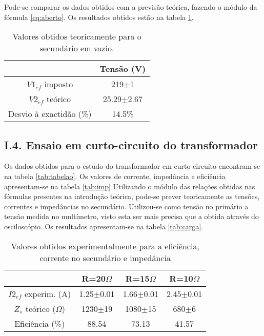 \documentclass[%
  reprint,
  nofootinbib,
  amsmath,amssymb,
  aps,
  10pt,
]{revtex4-1}
\begin{document}
Pode-se comparar os dados obtidos com a previsão teórica, fazendo o módulo da fórmula \ref{eq:aberto}. Os resultados obtidos estão na tabela \ref{tab:vazio}.
\begin{table}[h]
\begin{tabular}{|c|c|}
                       & Tensão (V)     \\ \hline
$V1_{ef}$  imposto     & 219$\pm$1      \\
$V2_{ef}$ teórico      & 25.29$\pm$2.67 \\
Desvio à exactidão (\%) & 14.5\%        
\end{tabular}
\caption{Valores obtidos teoricamente para o secundário em vazio.}
\label{tab:vazio}
\end{table}

\subsection*{I.4. Ensaio em curto-circuito do transformador}
Os dados obtidos para o estudo do transformador em curto-circuito encontram-se na tabela \ref{tab:tabelao}. Os valores de corrente, impedância e eficiência apresentam-se na tabela \ref{tab:imp} Utilizando o módulo das relações obtidas nas fórmulas presentes na introdução teórica, pode-se prever teoricamente as tensões, correntes e impedâncias no secundário. Utilizou-se como tensão no primário a tensão medida no multímetro, visto esta ser mais precisa que a obtida através do osciloscópio. Os resultados apresentam-se na tabela \ref{tab:carga}.

\begin{table}[h]
\begin{tabular}{c|c|c|c}
                         & R=20$\Omega$  & R=15$\Omega$  & R=10$\Omega$  \\ \hline
$I2_{ef}$ experim. (A)   & 1.25$\pm$0.01 & 1.66$\pm$0.01 & 2.45$\pm$0.01 \\ \hline
$Z_s$ teórico ($\Omega$) & 1230$\pm$19   & 1080$\pm$15   & 680$\pm$6     \\ \hline
Eficiência (\%)          & 88.54         & 73.13         & 41.57        
\end{tabular}
\caption{Valores obtidos experimentalmente para a eficiência, corrente no secundário e impedância}
\end{table}
\end{document}
